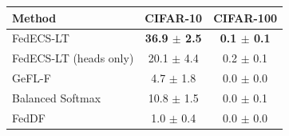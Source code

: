 \begin{tabular}{lcc}
\toprule
Method & CIFAR-10 & CIFAR-100\\
\midrule
FedECS-LT & \textbf{36.9 $\pm$ 2.5} & \textbf{0.1 $\pm$ 0.1}\\
FedECS-LT (heads only) & 20.1 $\pm$ 4.4 & 0.2 $\pm$ 0.1\\
GeFL-F & 4.7 $\pm$ 1.8 & 0.0 $\pm$ 0.0\\
Balanced Softmax & 10.8 $\pm$ 1.5 & 0.0 $\pm$ 0.1\\
FedDF & 1.0 $\pm$ 0.4 & 0.0 $\pm$ 0.0\\
\bottomrule
\end{tabular}
